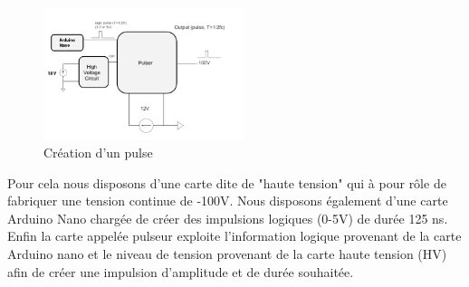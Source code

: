 \documentclass[12pt]{article}
\begin{document}
\begin{figure}
  \vspace{-50pt}
  \hspace{-20pt}
  \begin{center}
    \includegraphics[width=0.52\textwidth]{Images_Rapport/hv}
  \end{center}
  \vspace{-5pt}
  \caption{Création d'un pulse}
  \vspace{-10pt}
\end{figure}


\vspace{15pt}
Pour cela nous disposons d'une carte dite de "haute tension" qui à pour rôle de fabriquer une tension continue de -100V. Nous disposons également d'une carte Arduino Nano chargée de créer des impulsions logiques (0-5V) de durée 125 ns. Enfin la carte appelée pulseur exploite l'information logique provenant de la carte Arduino nano et le niveau de tension provenant de la carte haute tension (HV) afin de créer une impulsion d'amplitude et de durée souhaitée.
\vspace{30pt}
\end{document}
